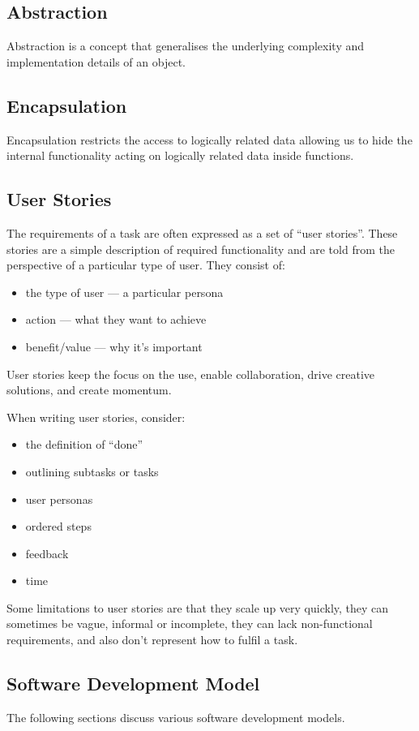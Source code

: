 \documentclass{article}
\begin{document}
\subsection{Abstraction}
Abstraction is a concept that generalises the underlying complexity
and implementation details of an object.
\subsection{Encapsulation}
Encapsulation restricts the access to logically related data
allowing us to hide the internal \linebreak functionality acting on logically
related data inside functions.
\subsection{User Stories}
The requirements of a task are often expressed as a set of ``user stories''. These
stories are a simple description of required functionality and are told from the perspective
of a particular type of user. They consist of:
\begin{itemize}
    \item the type of user --- a particular persona
    \item action --- what they want to achieve
    \item benefit/value --- why it's important
\end{itemize}
User stories keep the focus on the use, enable collaboration, drive creative solutions, and create momentum.

When writing user stories, consider:
\begin{itemize}
    \item the definition of ``done''
    \item outlining subtasks or tasks
    \item user personas
    \item ordered steps
    \item feedback
    \item time
\end{itemize}
Some limitations to user stories are that they scale up very quickly, they can sometimes
be vague, informal or incomplete, they can lack non-functional requirements, and also don't
represent how to fulfil a task.
\subsection{Software Development Model}
The following sections discuss various software development models.
\end{document}
